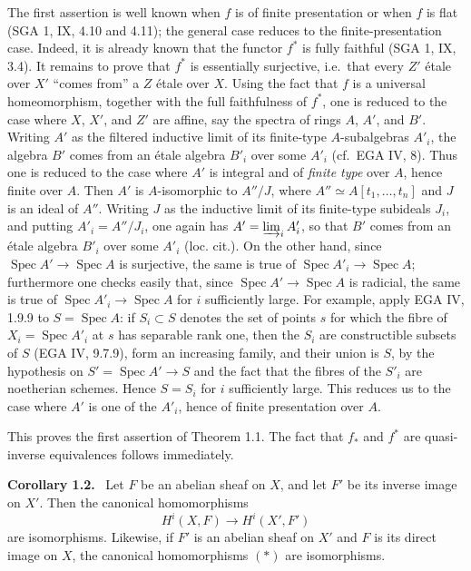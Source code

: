 \documentclass[11pt]{article}
\newcommand{\Spec}{\operatorname{Spec}}
\newcommand{\ie}{i.e.\ }
\newcommand{\cf}{cf.\ }
\newcommand{\SGA}{SGA}
\newcommand{\EGA}{EGA}
\newenvironment{statement}[1]{\par\medskip\noindent\textbf{#1.}\ }{\par\medskip}
\begin{document}
The first assertion is well known when \(f\) is of finite presentation or when \(f\) is flat (\SGA{} 1, IX, 4.10 and 4.11); the general case reduces to the finite-presentation case. Indeed, it is already known that the functor \(f^*\) is fully faithful (\SGA{} 1, IX, 3.4). It remains to prove that \(f^*\) is essentially surjective, \ie that every \(Z'\) \'etale over \(X'\) ``comes from'' a \(Z\) \'etale over \(X\). Using the fact that \(f\) is a universal homeomorphism, together with the full faithfulness of \(f^*\), one is reduced to the case where \(X\), \(X'\), and \(Z'\) are affine, say the spectra of rings \(A\), \(A'\), and \(B'\). Writing \(A'\) as the filtered inductive limit of its finite-type \(A\)-subalgebras \(A'_i\), the algebra \(B'\) comes from an \'etale algebra \(B'_i\) over some \(A'_i\) (\cf \EGA{} IV, 8). Thus one is reduced to the case where \(A'\) is integral and of \emph{finite type} over \(A\), hence finite over \(A\). Then \(A'\) is \(A\)-isomorphic to \(A''/J\), where \(A''\simeq A[t_1,\ldots,t_n]\) and \(J\) is an ideal of \(A''\). Writing \(J\) as the inductive limit of its finite-type subideals \(J_i\), and putting \(A'_i=A''/J_i\), one again has \(A'=\varinjlim_i A'_i\), so that \(B'\) comes from an \'etale algebra \(B'_i\) over some \(A'_i\) (loc. cit.). On the other hand, since \(\Spec A'\to\Spec A\) is surjective, the same is true of \(\Spec A'_i\to\Spec A\); furthermore one checks easily that, since \(\Spec A'\to\Spec A\) is radicial, the same is true of \(\Spec A'_i\to\Spec A\) for \(i\) sufficiently large. For example, apply \EGA{} IV, 1.9.9 to \(S=\Spec A\): if \(S_i\subset S\) denotes the set of points \(s\) for which the fibre of \(X_i=\Spec A'_i\) at \(s\) has separable rank one, then the \(S_i\) are constructible subsets of \(S\) (\EGA{} IV, 9.7.9), form an increasing family, and their union is \(S\), by the hypothesis on \(S'=\Spec A'\to S\) and the fact that the fibres of the \(S'_i\) are noetherian schemes. Hence \(S=S_i\) for \(i\) sufficiently large. This reduces us to the case where \(A'\) is one of the \(A'_i\), hence of finite presentation over \(A\).

This proves the first assertion of Theorem 1.1. The fact that \(f_*\) and \(f^*\) are quasi-inverse equivalences follows immediately.

\begin{statement}{Corollary 1.2}
Let \(F\) be an abelian sheaf on \(X\), and let \(F'\) be its inverse image on \(X'\). Then the canonical homomorphisms
\[
H^i(X,F)\longrightarrow H^i(X',F')
\tag{*}
\]
are isomorphisms. Likewise, if \(F'\) is an abelian sheaf on \(X'\) and \(F\) is its direct image on \(X\), the canonical homomorphisms \((*)\) are isomorphisms.
\end{statement}
\end{document}

